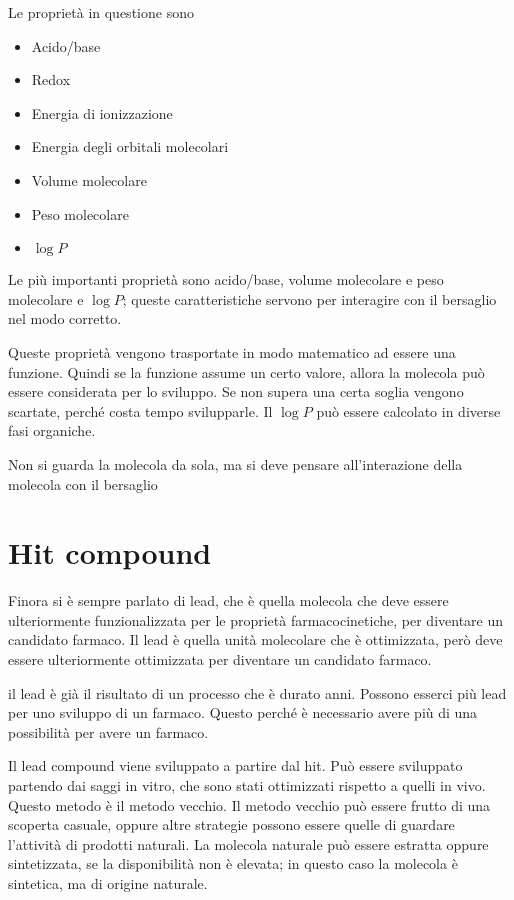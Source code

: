 Le proprietà in questione sono
\begin{itemize}
\item Acido/base
\item Redox
\item Energia di ionizzazione
\item Energia degli orbitali molecolari
\item Volume molecolare
\item Peso molecolare
\item $\log P$
\end{itemize}
Le più importanti proprietà sono acido/base, volume molecolare e peso molecolare e
$\log P$; queste caratteristiche servono per interagire con il bersaglio nel modo
corretto.

Queste proprietà vengono trasportate in modo matematico ad essere una
funzione. Quindi se la funzione assume un certo valore, allora la
molecola può essere considerata per lo sviluppo. Se non supera una certa
soglia vengono scartate, perché costa tempo svilupparle.
Il \(\log{} P\) può essere calcolato in diverse fasi organiche.

Non si guarda la molecola da sola, ma si deve pensare all'interazione
della molecola con il bersaglio


\section{Hit compound}

Finora si è sempre parlato di lead, che è quella molecola che deve
essere ulteriormente funzionalizzata per le proprietà farmacocinetiche,
per diventare un candidato farmaco. Il lead è quella unità molecolare
che è ottimizzata, però deve essere ulteriormente ottimizzata per
diventare un candidato farmaco.

il lead è già il risultato di un processo che è durato anni. Possono
esserci più lead per uno sviluppo di un farmaco. Questo perché è
necessario avere più di una possibilità per avere un farmaco.

Il lead compound viene sviluppato a partire dal hit. Può essere
sviluppato partendo dai saggi in vitro, che sono stati ottimizzati
rispetto a quelli in vivo. Questo metodo è il metodo vecchio. Il metodo
vecchio può essere frutto di una scoperta casuale, oppure altre
strategie possono essere quelle di guardare l'attività di prodotti
naturali. La molecola naturale può essere estratta oppure sintetizzata,
se la disponibilità non è elevata; in questo caso la molecola è
sintetica, ma di origine naturale.

